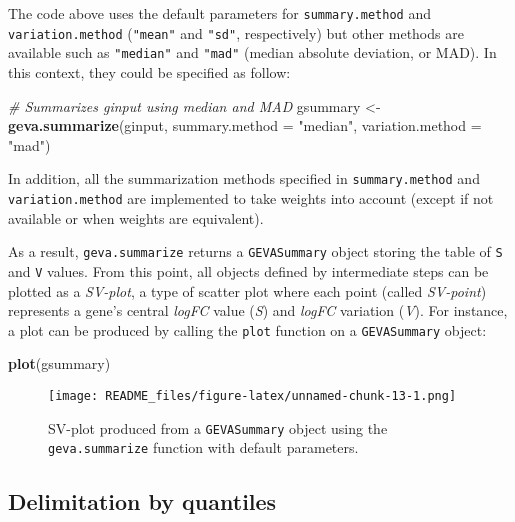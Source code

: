 \documentclass[
  12pt,
]{article}
\newenvironment{Shaded}{\begin{snugshade}}{\end{snugshade}}
\newcommand{\CommentTok}[1]{\textcolor[rgb]{0.56,0.35,0.01}{\textit{#1}}}
\newcommand{\DataTypeTok}[1]{\textcolor[rgb]{0.13,0.29,0.53}{#1}}
\newcommand{\KeywordTok}[1]{\textcolor[rgb]{0.13,0.29,0.53}{\textbf{#1}}}
\newcommand{\NormalTok}[1]{#1}
\newcommand{\StringTok}[1]{\textcolor[rgb]{0.31,0.60,0.02}{#1}}
\begin{document}
The code above uses the default parameters for \texttt{summary.method}
and \texttt{variation.method} (\texttt{"mean"} and \texttt{"sd"},
respectively) but other methods are available such as \texttt{"median"}
and \texttt{"mad"} (median absolute deviation, or MAD). In this context,
they could be specified as follow:

\begin{Shaded}
\begin{Highlighting}[]
\CommentTok{# Summarizes ginput using median and MAD}
\NormalTok{gsummary <-}\StringTok{ }\KeywordTok{geva.summarize}\NormalTok{(ginput,}
                           \DataTypeTok{summary.method =} \StringTok{"median"}\NormalTok{,}
                           \DataTypeTok{variation.method =} \StringTok{"mad"}\NormalTok{)}
\end{Highlighting}
\end{Shaded}

In addition, all the summarization methods specified in
\texttt{summary.method} and \texttt{variation.method} are implemented to
take weights into account (except if not available or when weights are
equivalent).

As a result, \texttt{geva.summarize} returns a \texttt{GEVASummary}
object storing the table of \texttt{S} and \texttt{V} values. From this
point, all objects defined by intermediate steps can be plotted as a
\emph{SV-plot}, a type of scatter plot where each point (called
\emph{SV-point}) represents a gene's central \emph{logFC} value
(\emph{S}) and \emph{logFC} variation (\emph{V}). For instance, a plot
can be produced by calling the \texttt{plot} function on a
\texttt{GEVASummary} object:

\begin{Shaded}
\begin{Highlighting}[]
\KeywordTok{plot}\NormalTok{(gsummary)}
\end{Highlighting}
\end{Shaded}

\begin{figure}
\centering
\texttt{[image: README\_files/figure-latex/unnamed-chunk-13-1.png]}
\caption{SV-plot produced from a \texttt{GEVASummary} object using the
\texttt{geva.summarize} function with default parameters.}
\end{figure}

\hypertarget{delimitation-by-quantiles}{%
\subsection{Delimitation by quantiles}\label{delimitation-by-quantiles}}
\end{document}
